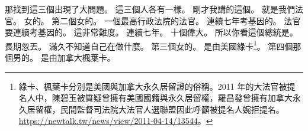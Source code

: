 \hypertarget{c01:cue:3365}{}那找到這三個出現了大問題。
\hypertarget{c01:cue:3366}{}這三個人各有一樣。
\hypertarget{c01:cue:3367}{}剛才我講的這個。
\hypertarget{c01:cue:3368}{}就是我們法官。
\hypertarget{c01:cue:3369}{}女的。
\hypertarget{c01:cue:3370}{}第二個女的。
\hypertarget{c01:cue:3371}{}一個最高行政法院的法官。
\hypertarget{c01:cue:3372}{}連續七年考基因的。
\hypertarget{c01:cue:3373}{}法官要連續考基因的。
\hypertarget{c01:cue:3374}{}這非常難度。
\hypertarget{c01:cue:3375}{}連續七年。
\hypertarget{c01:cue:3376}{}十個偉大。
\hypertarget{c01:cue:3377}{}所以你看這個總統是。
\hypertarget{c01:cue:3378}{}長期忽丟。
\hypertarget{c01:cue:3379}{}滿久不知道自己在做什麼。
\hypertarget{c01:cue:3380}{}第三個女的。
\hypertarget{c01:cue:3381}{}是由美國綠卡\footnote{綠卡、楓葉卡分別是美國與加拿大永久居留證的俗稱。2011 年的大法官被提名人中，陳碧玉被質疑曾擁有美國國籍與永久居留權，羅昌發曾擁有加拿大永久居留權，民間監督司法院大法官人選聯盟因此呼籲被提名人婉拒提名。\url{https://newtalk.tw/news/view/2011-04-14/13544}。}。
\hypertarget{c01:cue:3382}{}第四個那個男的。
\hypertarget{c01:cue:3383}{}是由加拿大楓葉卡。

